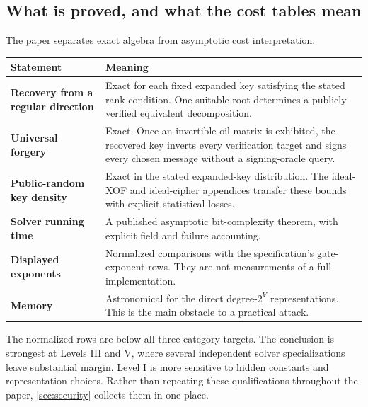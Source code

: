 \documentclass[11pt,a4paper]{article}
\theoremstyle{definition}
\theoremstyle{remark}
\begin{document}
\subsection*{What is proved, and what the cost tables mean}
The paper separates exact algebra from asymptotic cost interpretation.
\begin{center}
\small
\setlength{\tabcolsep}{4.5pt}
\renewcommand{\arraystretch}{1.16}
\begin{tabularx}{0.97\textwidth}{@{}>{\raggedright\arraybackslash\bfseries}p{}X@{}}
\toprule
Statement & Meaning \\
\midrule
Recovery from a regular direction & Exact for each fixed expanded key satisfying the stated rank condition.  One suitable root determines a publicly verified equivalent decomposition. \\
Universal forgery & Exact.  Once an invertible oil matrix is exhibited, the recovered key inverts every verification target and signs every chosen message without a signing-oracle query. \\
Public-random key density & Exact in the stated expanded-key distribution.  The ideal-XOF and ideal-cipher appendices transfer these bounds with explicit statistical losses. \\
Solver running time & A published asymptotic bit-complexity theorem, with explicit field and failure accounting. \\
Displayed exponents & Normalized comparisons with the specification's gate-exponent rows.  They are not measurements of a full implementation. \\
Memory & Astronomical for the direct degree-$2^V$ representations.  This is the main obstacle to a practical attack. \\
\bottomrule
\end{tabularx}
\end{center}

The normalized rows are below all three category targets.  The conclusion is strongest at Levels III and V, where several independent solver specializations leave substantial margin.  Level I is more sensitive to hidden constants and representation choices.  Rather than repeating these qualifications throughout the paper, \cref{sec:security} collects them in one place.
\end{document}
